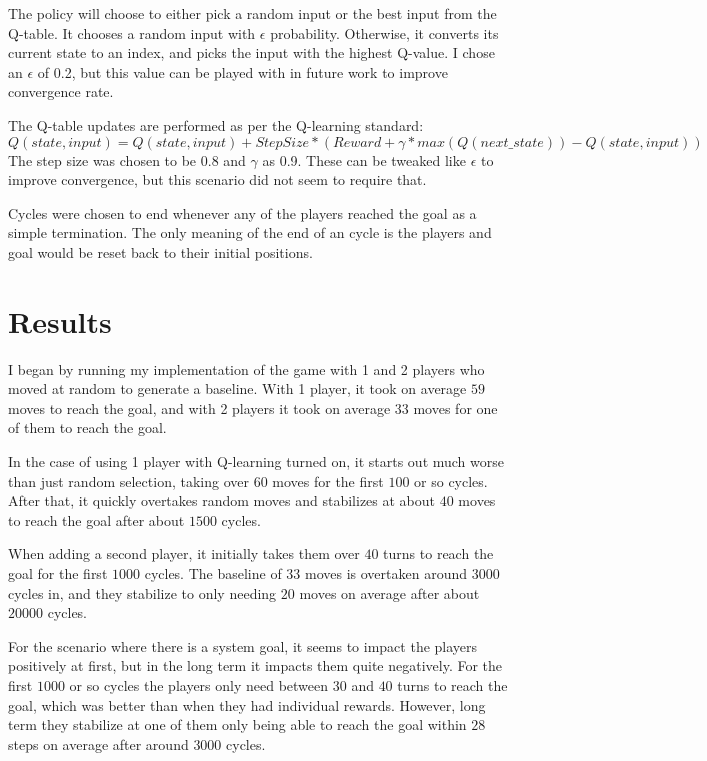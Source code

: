 \documentclass[sigconf]{aamas}
\begin{document}
The policy will choose to either pick a random input or the best input 
from the Q-table. It chooses a random input with $\epsilon$ probability.
Otherwise, it converts its current state to an index, and picks the input 
with the highest Q-value. I chose an $\epsilon$ of 0.2, but this value can be 
played with in future work to improve convergence rate.

The Q-table updates are performed as per the Q-learning standard: 
$Q(state, input) = Q(state, input) + StepSize * (Reward + \gamma*max(Q(next\_state)) - Q(state, input))$
The step size was chosen to be 0.8 and $\gamma$ as 0.9. These can be tweaked 
like $\epsilon$ to improve convergence, but this scenario did not seem to 
require that.

Cycles were chosen to end whenever any of the players reached the goal as 
a simple termination. The only meaning of the end of an cycle is the players 
and goal would be reset back to their initial positions.


\section{Results}

I began by running my implementation of the game with 1 and 2 players who
moved at random to generate a baseline. With 1 player, it took on average 
$59$ moves to reach the goal, and with 2 players it took on average $33$ 
moves for one of them to reach the goal.

In the case of using 1 player with Q-learning turned on, it starts out 
much worse than just random selection, taking over 60 moves for the first 
$100$ or so cycles. After that, it quickly overtakes random moves and 
stabilizes at about $40$ moves to reach the goal after about $1500$ cycles.

When adding a second player, it initially takes them over $40$ turns to 
reach the goal for the first $1000$ cycles. The baseline of $33$ moves is
overtaken around $3000$ cycles in, and they stabilize to only needing $20$
moves on average after about $20000$ cycles.

For the scenario where there is a system goal, it seems to impact the players
positively at first, but in the long term it impacts them quite negatively. 
For the first $1000$ or so cycles the players only need between $30$ and $40$
turns to reach the goal, which was better than when they had individual rewards.
However, long term they stabilize at one of them only being able to reach the 
goal within $28$ steps on average after around $3000$ cycles.
\end{document}
